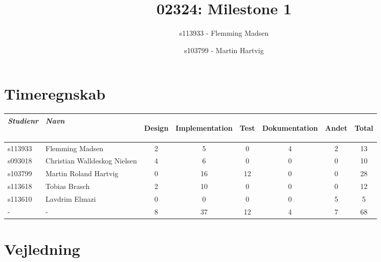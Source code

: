 \documentclass[a4paper]{article}
\title{02324: Milestone 1}
\author{
  s113933 - Flemming Madsen
  \and
    s103799 - Martin Hartvig
}
\begin{document}
\tableofcontents

\vspace{5cm}

\section{Timeregnskab} %
\label{sec:Timeregnskab}
\begin{tabular}{l l | c c c c c | c}

  \emph{Studienr} & \emph{Navn}
  & \begin{sideways}Design\end{sideways} 
  & \begin{sideways}Implementation\end{sideways} 
  & \begin{sideways}Test\end{sideways} 
  & \begin{sideways}Dokumentation\end{sideways} 
  & \begin{sideways}Andet\end{sideways} 
  & \begin{sideways}Total\end{sideways} \\
  \hline
  s113933 & Flemming Madsen              & 2 & 5  & 0  & 4 & 2 & 13 \\
  s093018 & Christian Walldeskog Nielsen & 4 & 6  & 0  & 0 & 0 & 10 \\
  s103799 & Martin Roland Hartvig        & 0 & 16 & 12 & 0 & 0 & 28 \\
  s113618 & Tobias Brasch                & 2 & 10 & 0  & 0 & 0 & 12 \\
  s113610 & Lavdrim Elmazi               & 0 & 0  & 0  & 0 & 5 & 5 \\
  \hline
  -       & -                            & 8 & 37 & 12 & 4 & 7 & 68
  
\end{tabular}


\clearpage



\section{Vejledning} %
\label{sec:Vejledning}

\end{document}
